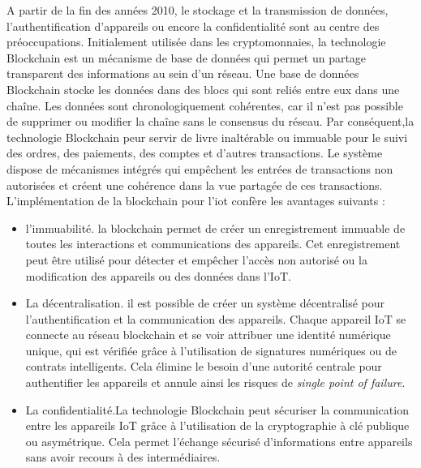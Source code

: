 A partir de la fin des années 2010, le stockage et la transmission de données, l'authentification d'appareils ou encore la confidentialité sont au centre des préoc\-cupations. Initialement utilisée dans les cryptomonnaies, la technologie Blockchain est un mécanisme de base de données qui permet un partage transparent des informations au sein d'un réseau. Une base de données Blockchain stocke les données dans des blocs qui sont reliés entre eux dans une chaîne. Les données sont chronologiquement cohérentes, car il n'est pas possible de supprimer ou modifier la chaîne sans le consensus du réseau. Par conséquent,la technologie Blockchain peur servir de livre inaltérable ou immuable pour le suivi des ordres, des paiements, des comptes et d'autres transactions. Le système dispose de mécanismes intégrés qui empêchent les entrées de transactions non autorisées et créent une cohérence dans la vue partagée de ces transactions. L'implémentation de la blockchain pour l'iot confère les avantages suivants\cite{block} : 
\begin{itemize}
\item l'immuabilité. la blockchain permet de créer un enregistrement immuable de toutes les interactions et communications des appareils. Cet enregistrement peut être utilisé pour détecter et empêcher l'accès non autorisé ou la modification des appareils ou des données dans l'IoT.
\item La décentralisation. il est possible de créer un système décentralisé pour l’authentification et la communication des appareils. Chaque appareil IoT se connecte au réseau blockchain et se voir attribuer une identité numérique unique, qui est vérifiée grâce à l'utilisation de signatures numériques ou de contrats intelligents. Cela élimine le besoin d’une autorité centrale pour authentifier les appareils et annule ainsi les risques de \textit{single point of failure}.
\item La confidentialité.La technologie Blockchain peut sécuriser la communication entre les appareils IoT grâce à l'utilisation de la cryptographie à clé publique ou asymétrique. Cela permet l’échange sécurisé d’informations entre appareils sans avoir recours à des intermédiaires.
\end{itemize}

\vspace{0.1cm}

